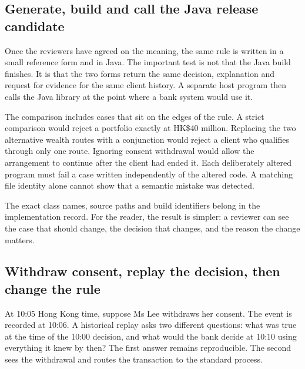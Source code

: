 \subsection{Generate, build and call the Java release candidate}
\label{merge:P-01b-complete-dry-run:05}


Once the reviewers have agreed on the meaning, the same rule is written in a
small reference form and in Java. The important test is not that the Java build
finishes. It is that the two forms return the same decision, explanation and
request for evidence for the same client history. A separate host program then
calls the Java library at the point where a bank system would use it.

The comparison includes cases that sit on the edges of the rule. A strict
comparison would reject a portfolio exactly at HK\$40 million. Replacing the two
alternative wealth routes with a conjunction would reject a client who qualifies
through only one route. Ignoring consent withdrawal would allow the arrangement
to continue after the client had ended it. Each deliberately altered program
must fail a case written independently of the altered code. A matching file
identity alone cannot show that a semantic mistake was detected.

The exact class names, source paths and build identifiers belong in the
implementation record. For the reader, the result is simpler: a reviewer can
see the case that should change, the decision that changes, and the reason the
change matters.




\subsection{Withdraw consent, replay the decision, then change the rule}
\label{merge:P-01b-complete-dry-run:06}


At 10:05 Hong Kong time, suppose Ms Lee withdraws her consent. The event is
recorded at 10:06. A historical replay asks two different questions: what was
true at the time of the 10:00 decision, and what would the bank decide at 10:10
using everything it knew by then? The first answer remains reproducible. The
second sees the withdrawal and routes the transaction to the standard process.

